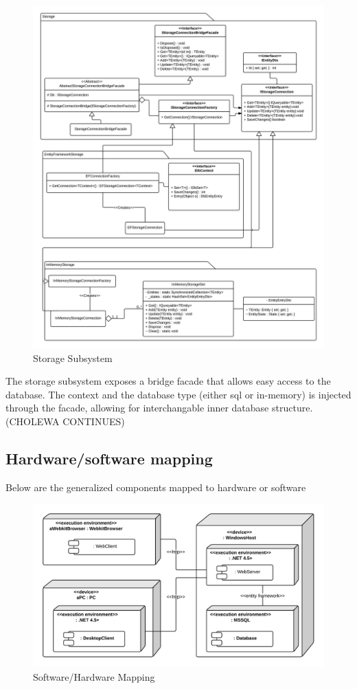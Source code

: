 \begin{figure}[H]
\includegraphics[scale=0.135]{img/SDD/StoragePackage.png}
\caption{Storage Subsystem}
\label{fig:Storage}
\end{figure}

The storage subsystem exposes a bridge facade that allows easy access to the database. The context and the database type (either sql or in-memory) is injected through the facade, allowing for interchangable inner database structure. (CHOLEWA CONTINUES)

\subsection{Hardware/software mapping}
\label{sec:Hardware/software mapping}
Below are the generalized components mapped to hardware or software
\begin{figure}[H]
\includegraphics[scale=0.2]{img/SDD/SoftwareHardwareMapping.png}
\caption{Software/Hardware Mapping}
\label{fig:SoftwareHardwareMapping}
\end{figure}

